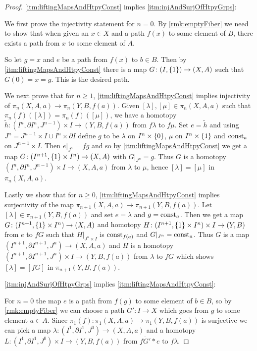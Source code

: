 \begin{prop}
\begin{proof}
        \ref{itm:liftingMapsAndHtpyConst} implies \ref{itm:injAndSurjOfHtpyGrps}:

        We first prove the injectivity statement for $n=0$. 
        By \cref{rmk:emptyFiber} we need to show that when given an $x\in X$ and a path $f(x)$ to some element of $B$, there exists a path from $x$ to some element of $A$.

        So let $g=x$ and $e$ be a path from $f(x)$ to $b\in B$.
        Then by \ref{itm:liftingMapsAndHtpyConst} there is a map $G\colon (I,\left\lbrace1\right\rbrace)\to(X,A)$ such that $G(0)=x=g$.
        This is the desired path.

        We next prove that for $n\geq 1$, \ref{itm:liftingMapsAndHtpyConst} implies injectivity of $\pi_n(X,A,a)\to \pi_n(Y,B,f(a))$.
        Given $[\lambda],[\mu]\in\pi_n(X,A,a)$ such that $\pi_n(f)([\lambda])=\pi_n(f)([\mu])$, we have a homotopy $\widetilde{h}\colon(I^n,\partial I^n,J^{n-1})\times I\to (Y,B,f(a))$ from $f\lambda$ to $f\mu$.
        Set $e=\widetilde{h}$ and using $J^n=J^{n-1}\times I\cup I^n\times\partial I$ define $g$ to be $\lambda$ on $I^n\times\left\lbrace0\right\rbrace$, $\mu$ on $I^n\times\left\lbrace1\right\rbrace$ and $\operatorname{const}_a$ on $J^{n-1}\times I$.
        Then $e|_{J^n}=fg$ and so by \ref{itm:liftingMapsAndHtpyConst} we get a map $G\colon(I^{n+1},\left\lbrace1\right\rbrace\times I^n)\to(X,A)$ with $G|_{J^n}=g$. 
        Thus $G$ is a homotopy $(I^n,\partial I^n,J^{n-1})\times I\to(X,A,a)$ from $\lambda$ to $\mu$, hence $[\lambda]=[\mu]$ in $\pi_n(X,A,a)$.

        Lastly we show that for $n\geq 0$, \ref{itm:liftingMapsAndHtpyConst} implies surjectivity of the map $\pi_{n+1}(X,A,a)\to \pi_{n+1}(Y,B,f(a))$.
        Let $[\lambda]\in\pi_{n+1}(Y,B,f(a))$ and set $e=\lambda$ and $g=\operatorname{const}_a$. 
        Then we get a map $G\colon(I^{n+1},\left\lbrace1\right\rbrace\times I^n)\to(X,A)$ and homotopy $H\colon(I^{n+1},\left\lbrace1\right\rbrace\times I^n)\times I\to(Y,B)$ from $e$ to $fG$ such that $H|_{J^n\times I}$ is $\operatorname{const}_{f(a)}$ and $G|_{J^n}=\operatorname{const}_a$.
        Thus $G$ is a map $(I^{n+1},\partial I^{n+1},J^n)\to (X,A,a)$ and $H$ is a homotopy $(I^{n+1},\partial I^{n+1},J^n)\times I\to(Y,B,f(a))$ from $\lambda$ to $fG$ which shows $[\lambda]=[fG]$ in $\pi_{n+1}(Y,B,f(a))$.

        \ref{itm:injAndSurjOfHtpyGrps} implies \ref{itm:liftingMapsAndHtpyConst}:

        For $n=0$ the map $e$ is a path from $f(g)$ to some element of $b\in B$, so by \cref{rmk:emptyFiber} we can choose a path $G'\colon I\to X$ which goes from $g$ to some element $a\in A$.
        Since $\pi_1(f)\colon\pi_1(X,A,a)\to\pi_1(Y,B,f(a))$ is surjective we can pick a map $\lambda\colon(I^1,\partial I^1,J^0)\to(X,A,a)$ and a homotopy $L\colon(I^1,\partial I^1,J^0)\times I\to(Y,B,f(a))$ from $\overline{fG'}*e$ to $f\lambda$.
        

\end{proof}
\end{prop}
